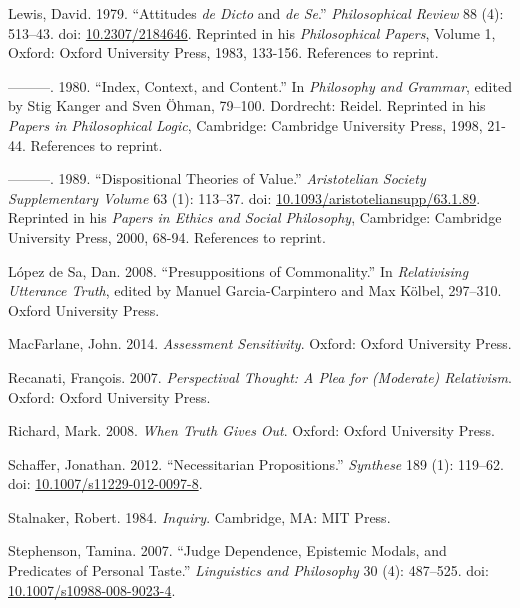 \documentclass[
  11pt,
  letterpaper,
  DIV=11,
  numbers=noendperiod,
  twoside]{scrartcl}
\newlength{\cslhangindent}
\newenvironment{CSLReferences}[2] %
 {\begin{list}{}{%
  \setlength{\itemindent}{0pt}
  \setlength{\leftmargin}{0pt}
  \setlength{\parsep}{0pt}
  \ifodd #1
   \setlength{\leftmargin}{\cslhangindent}
   \setlength{\itemindent}{-1\cslhangindent}
  \fi
  \setlength{\itemsep}{#2\baselineskip}}}
 {\end{list}}
\begin{document}
\begin{CSLReferences}{1}{0}
Lewis, David. 1979. {``Attitudes \emph{de Dicto} and \emph{de Se}.''}
\emph{Philosophical Review} 88 (4): 513--43. doi:
\href{https://doi.org/10.2307/2184646}{10.2307/2184646}. Reprinted in
his \emph{Philosophical Papers}, Volume 1, Oxford: Oxford University
Press, 1983, 133-156. References to reprint.

---------. 1980. {``Index, Context, and Content.''} In \emph{Philosophy
and Grammar}, edited by Stig Kanger and Sven Öhman, 79--100. Dordrecht:
Reidel. Reprinted in his \emph{Papers in Philosophical Logic},
Cambridge: Cambridge University Press, 1998, 21-44. References to
reprint.

---------. 1989. {``Dispositional Theories of Value.''}
\emph{Aristotelian Society Supplementary Volume} 63 (1): 113--37. doi:
\href{https://doi.org/10.1093/aristoteliansupp/63.1.89}{10.1093/aristoteliansupp/63.1.89}.
Reprinted in his \emph{Papers in Ethics and Social Philosophy},
Cambridge: Cambridge University Press, 2000, 68-94. References to
reprint.

López de Sa, Dan. 2008. {``Presuppositions of Commonality.''} In
\emph{Relativising Utterance Truth}, edited by Manuel Garcia-Carpintero
and Max Kölbel, 297--310. Oxford University Press.

MacFarlane, John. 2014. \emph{Assessment Sensitivity}. Oxford: Oxford
University Press.

Recanati, François. 2007. \emph{Perspectival Thought: A Plea for
(Moderate) Relativism}. Oxford: Oxford University Press.

Richard, Mark. 2008. \emph{When Truth Gives Out}. Oxford: Oxford
University Press.

Schaffer, Jonathan. 2012. {``Necessitarian Propositions.''}
\emph{Synthese} 189 (1): 119--62. doi:
\href{https://doi.org/10.1007/s11229-012-0097-8}{10.1007/s11229-012-0097-8}.

Stalnaker, Robert. 1984. \emph{Inquiry}. Cambridge, MA: MIT Press.

Stephenson, Tamina. 2007. {``Judge Dependence, Epistemic Modals, and
Predicates of Personal Taste.''} \emph{Linguistics and Philosophy} 30
(4): 487--525. doi:
\href{https://doi.org/10.1007/s10988-008-9023-4}{10.1007/s10988-008-9023-4}.


\end{CSLReferences}
\end{document}
